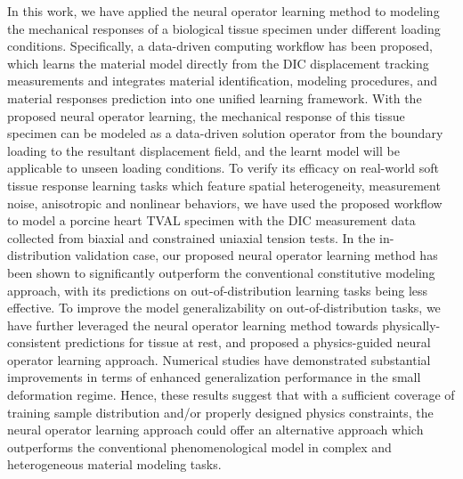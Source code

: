 \documentclass[twocolumn,10pt]{asme2ej}
\renewcommand{\~}{\tilde}
\renewcommand{\-}{\bar}
\newcommand{\8}{\infty}
\numberwithin{equation}{section}
\begin{document}
In this work, we have applied the neural operator learning method to modeling the mechanical responses of a biological tissue specimen under different loading conditions. Specifically, a data-driven computing workflow has been proposed, which learns the material model directly from the DIC displacement tracking measurements and integrates material identification, modeling procedures, and material responses prediction into one unified learning framework. With the proposed neural operator learning, the mechanical response of this tissue specimen can be modeled as a data-driven solution operator from the boundary loading to the resultant displacement field, and the learnt model will be applicable to unseen loading conditions. To verify its efficacy on real-world soft tissue response learning tasks which feature spatial heterogeneity, measurement noise, anisotropic and nonlinear behaviors, we have used the proposed workflow to model a porcine heart TVAL specimen with the DIC measurement data collected from biaxial and constrained uniaxial tension tests. In the in-distribution validation case, our proposed neural operator learning method has been shown to significantly outperform the conventional constitutive modeling approach, with its predictions on out-of-distribution learning tasks being less effective. To improve the model generalizability on out-of-distribution tasks, we have further leveraged the neural operator learning method towards physically-consistent predictions for tissue at rest, and proposed a physics-guided neural operator learning approach. Numerical studies have demonstrated substantial improvements in terms of enhanced generalization performance in the small deformation regime. Hence, these results suggest that with a sufficient coverage of training sample distribution and/or properly designed physics constraints, the neural operator learning approach could offer an alternative approach which outperforms the conventional phenomenological model in complex and heterogeneous material modeling tasks.
\end{document}
